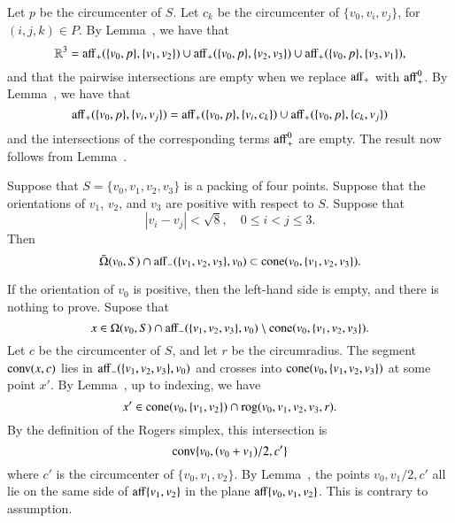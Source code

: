 \begin{tarskidata}
\begin{tarski}
\begin{proved} Let $p$ be the circumcenter of $S$.  Let $c_k$
be the circumcenter of $\{v_0,v_i,v_j\}$, for $(i,j,k)\in P$.
By Lemma~, we have that
   $$
   \mathbb{R}^3 = {\operatorname{aff}}_+(\{v_0,p\},\{v_1,v_2\}) \cup
     {\operatorname{aff}}_+(\{v_0,p\},\{v_2,v_3\}) \cup
     {\operatorname{aff}}_+(\{v_0,p\},\{v_3,v_1\}),
   $$
and that the pairwise intersections are empty when we replace
${\operatorname{aff}}_+$ with ${\operatorname{aff}}_+^0$.  By Lemma~,
we have that 
  $$
  {\operatorname{aff}}_+(\{v_0,p\},\{v_i,v_j\}) =
{\operatorname{aff}}_+(\{v_0,p\},\{v_i,c_k\}) \cup
{\operatorname{aff}}_+(\{v_0,p\},\{c_k,v_j\})
  $$
and the intersections of the corresponding terms ${\operatorname{aff}}_+^0$ 
are empty.
The result now follows from Lemma~.
\swallowed\end{proved}
\end{tarski}





\begin{tarski}

\begin{lemma}
Suppose that $S=\{v_0,v_1,v_2,v_3\}$ is a packing
of four points.  Suppose that
the orientations of $v_1$, $v_2$, and $v_3$ are positive with respect
to $S$.  Suppose that
  $$
  |v_i - v_j | < \sqrt8, \quad 0\le i < j \le 3.
  $$
Then
  $$
  \bar\Omega(v_0,S) \cap {\operatorname{aff}}_-(\{v_1,v_2,v_3\},v_0) \subset
  {\operatorname{cone}}(v_0,\{v_1,v_2,v_3\}).
  $$
\end{lemma}




\begin{proved}  If the orientation of $v_0$ is positive,
then the left-hand side is empty, and there is nothing to prove.
Supose that 
 $$x\in
   \Omega(v_0,S) \cap {\operatorname{aff}}_-(\{v_1,v_2,v_3\},v_0)
   \setminus
  {\operatorname{cone}}(v_0,\{v_1,v_2,v_3\}).
 $$
Let $c$ be the circumcenter of $S$, and let $r$ be the
circumradius.  The segment ${\operatorname{conv}}(x,c)$
lies in ${\operatorname{aff}}_-(\{v_1,v_2,v_3\},v_0)$ and crosses into
${\operatorname{cone}}(v_0,\{v_1,v_2,v_3\})$ at some point $x'$.  
By Lemma~, up to indexing,
we have 
  $$x'\in{\operatorname{cone}}(v_0,\{v_1,v_2\})\cap{\operatorname{rog}}(v_0,v_1,v_2,v_3,r).$$
By the definition of the Rogers simplex, this intersection is
  $${\operatorname{conv}}\{v_0,(v_0+v_1)/2,c'\}$$
where $c'$ is the circumcenter of $\{v_0,v_1,v_2\}$.
By Lemma~, the points $v_0,v_1/2,c'$ all lie
on the same side of ${\operatorname{aff}}\{v_1,v_2\}$ in the plane ${\operatorname{aff}}\{v_0,v_1,v_2\}$.  This is contrary to assumption.
\swallowed\end{proved}
\end{tarski}




\end{tarskidata}
